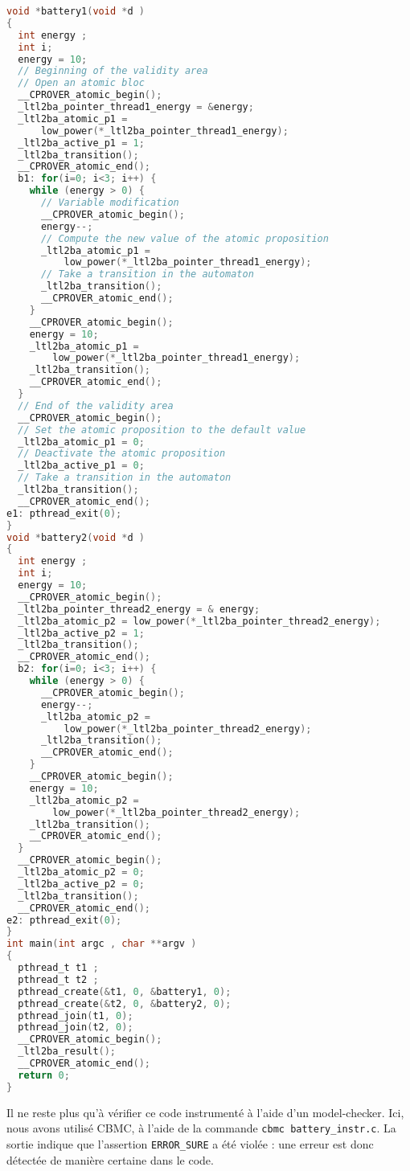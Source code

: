 \begin{lstlisting}[language=C, frame=single, caption=Code instrumenté]
void *battery1(void *d )
{
  int energy ;
  int i;
  energy = 10;
  // Beginning of the validity area
  // Open an atomic bloc
  __CPROVER_atomic_begin();
  _ltl2ba_pointer_thread1_energy = &energy;
  _ltl2ba_atomic_p1 =
      low_power(*_ltl2ba_pointer_thread1_energy);
  _ltl2ba_active_p1 = 1;
  _ltl2ba_transition();
  __CPROVER_atomic_end();
  b1: for(i=0; i<3; i++) {
    while (energy > 0) {
      // Variable modification
      __CPROVER_atomic_begin();
      energy--;
      // Compute the new value of the atomic proposition
      _ltl2ba_atomic_p1 =
          low_power(*_ltl2ba_pointer_thread1_energy);
      // Take a transition in the automaton
      _ltl2ba_transition();
      __CPROVER_atomic_end();
    }
    __CPROVER_atomic_begin();
    energy = 10;
    _ltl2ba_atomic_p1 =
        low_power(*_ltl2ba_pointer_thread1_energy);
    _ltl2ba_transition();
    __CPROVER_atomic_end();
  }
  // End of the validity area
  __CPROVER_atomic_begin();
  // Set the atomic proposition to the default value
  _ltl2ba_atomic_p1 = 0;
  // Deactivate the atomic proposition
  _ltl2ba_active_p1 = 0;
  // Take a transition in the automaton
  _ltl2ba_transition();
  __CPROVER_atomic_end();
e1: pthread_exit(0);
}
void *battery2(void *d )
{
  int energy ;
  int i;
  energy = 10;
  __CPROVER_atomic_begin();
  _ltl2ba_pointer_thread2_energy = & energy;
  _ltl2ba_atomic_p2 = low_power(*_ltl2ba_pointer_thread2_energy);
  _ltl2ba_active_p2 = 1;
  _ltl2ba_transition();
  __CPROVER_atomic_end();
  b2: for(i=0; i<3; i++) {
    while (energy > 0) {
      __CPROVER_atomic_begin();
      energy--;
      _ltl2ba_atomic_p2 =
          low_power(*_ltl2ba_pointer_thread2_energy);
      _ltl2ba_transition();
      __CPROVER_atomic_end();
    }
    __CPROVER_atomic_begin();
    energy = 10;
    _ltl2ba_atomic_p2 =
        low_power(*_ltl2ba_pointer_thread2_energy);
    _ltl2ba_transition();
    __CPROVER_atomic_end();
  }
  __CPROVER_atomic_begin();
  _ltl2ba_atomic_p2 = 0;
  _ltl2ba_active_p2 = 0;
  _ltl2ba_transition();
  __CPROVER_atomic_end();
e2: pthread_exit(0);
}
int main(int argc , char **argv )
{
  pthread_t t1 ;
  pthread_t t2 ;
  pthread_create(&t1, 0, &battery1, 0);
  pthread_create(&t2, 0, &battery2, 0);
  pthread_join(t1, 0);
  pthread_join(t2, 0);
  __CPROVER_atomic_begin();
  _ltl2ba_result();
  __CPROVER_atomic_end();
  return 0;
}
\end{lstlisting}

Il ne reste plus qu'à vérifier ce code instrumenté à l'aide d'un model-checker.
Ici, nous avons utilisé CBMC, à l'aide de la commande \texttt{cbmc
  battery\_instr.c}. La sortie indique que l'assertion \texttt{ERROR\_SURE} a été
violée : une erreur est donc détectée de manière certaine dans le code.